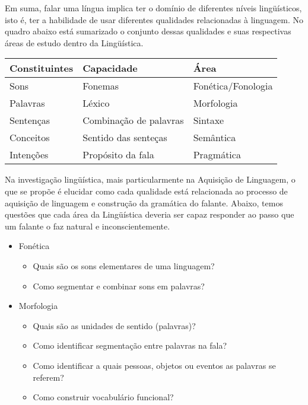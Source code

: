 Em suma, falar uma língua implica ter o domínio de diferentes níveis lingüísticos, isto é, 
ter a habilidade de usar diferentes qualidades relacionadas à linguagem. No quadro abaixo está sumarizado o conjunto dessas qualidades e suas respectivas áreas de estudo dentro da Lingüística.
 
\begin{center}
\begin{tabular}{| l | l | l |}
 \hline 
 \textbf{Constituintes} &  \textbf{Capacidade} & \textbf{Área} \\ 
 \hline 
 Sons & Fonemas & Fonética/Fonologia \\ 
 \hline 
 Palavras & Léxico & Morfologia \\ 
 \hline 
 Sentenças & Combinação de palavras & Sintaxe \\ 
 \hline 
 Conceitos & Sentido das senteças & Semântica \\ 
 \hline 
 Intenções & Propósito da fala & Pragmática \\ 
 \hline 
 \end{tabular}  
 \end{center}
 
Na investigação lingüística, mais particularmente na Aquisição de Linguagem, o que se propõe é elucidar como cada qualidade está relacionada ao processo de aquisição de linguagem e construção da gramática do falante. Abaixo, temos questões que cada área da Lingüística deveria ser capaz responder ao passo que um falante o faz natural e inconscientemente. \\
 
 \begin{itemize}
 \item Fonética
 	 \begin{itemize}
 		\item Quais são os sons elementares de uma linguagem?
 		\item Como segmentar e combinar sons em palavras?
 	\end{itemize}
 \end{itemize}

\begin{itemize}
 \item Morfologia
 	 \begin{itemize}
		\item Quais são as unidades de sentido (palavras)?
		\item Como identificar segmentação entre palavras na fala?
		\item Como identificar a quais pessoas, objetos ou eventos as palavras se referem?
		\item Como construir vocabulário funcional?
 	\end{itemize}
 \end{itemize}
 
